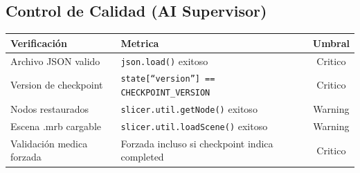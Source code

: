 \documentclass[12pt,a4paper]{article}
\begin{document}
\begin{tcolorbox}[aiSupervisor]
\subsection*{Control de Calidad (AI Supervisor)}

\begin{table}[H]
\centering
\begin{tabular}{llc}
\toprule
\textbf{Verificación} & \textbf{Metrica} & \textbf{Umbral} \\
\midrule
Archivo JSON valido & \texttt{json.load()} exitoso & Critico \\
Version de checkpoint & \texttt{state[``version''] == CHECKPOINT\_VERSION} & Critico \\
Nodos restaurados & \texttt{slicer.util.getNode()} exitoso & Warning \\
Escena .mrb cargable & \texttt{slicer.util.loadScene()} exitoso & Warning \\
Validación medica forzada & Forzada incluso si checkpoint indica completed & Critico \\
\bottomrule
\end{tabular}
\end{table}

\newpage


\newpage


\newpage


\newpage


\newpage


\newpage


\newpage


\newpage

\end{tcolorbox}
\end{document}
